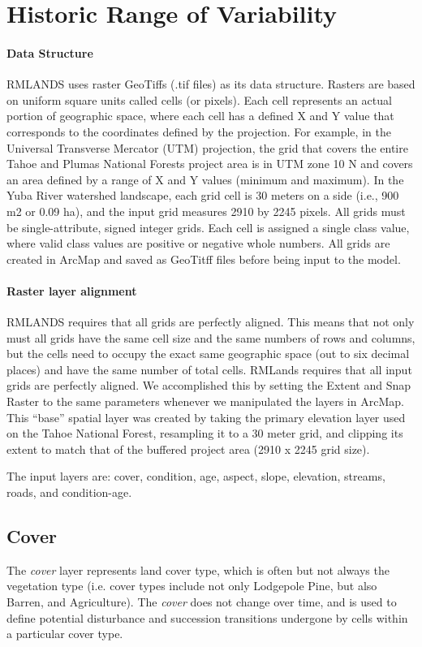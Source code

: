\section{Historic Range of Variability}

\paragraph{Data Structure} RMLANDS uses raster GeoTiffs (.tif files) as its data structure. Rasters are based on uniform square units called cells (or pixels). Each cell represents an actual portion of geographic space, where each cell has a defined X and Y value that corresponds to the coordinates defined by the projection. For example, in the Universal Transverse Mercator (UTM) projection, the grid that covers the entire Tahoe and Plumas National Forests project area is in UTM zone 10 N and covers an area defined by a range of X and Y values (minimum and maximum). In the Yuba River watershed landscape, each grid cell is 30 meters on a side (i.e., 900 m2 or 0.09 ha), and the input grid measures 2910 by 2245 pixels. All grids must be single-attribute, signed integer grids. Each cell is assigned a single class value, where valid class values are positive or negative whole numbers. All grids are created in ArcMap and saved as GeoTitff files before being input to the model. 

\paragraph{Raster layer alignment} RMLANDS requires that all grids are perfectly aligned. This means that not only must all grids have the same cell size and the same numbers of rows and columns, but the cells need to occupy the exact same geographic space (out to six decimal places) and have the same number of total cells. RMLands requires that all input grids are perfectly aligned. We accomplished this by setting the Extent and Snap Raster to the same parameters whenever we manipulated the layers in ArcMap. This ``base'' spatial layer was created by taking the primary elevation layer used on the Tahoe National Forest, resampling it to a 30 meter grid, and clipping its extent to match that of the buffered project area (2910 x 2245 grid size).

The input layers are: cover, condition, age, aspect, slope, elevation, streams, roads, and condition-age.

\subsection{Cover}
The \emph{cover} layer represents land cover type, which is often but not always the vegetation type (i.e. cover types include not only Lodgepole Pine, but also Barren, and Agriculture). The \emph{cover} does not change over time, and is used to define potential disturbance and succession transitions undergone by cells within a particular cover type.

